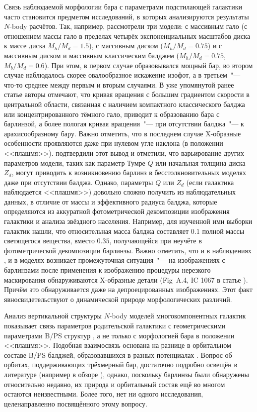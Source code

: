 \documentclass{trlnotes}
\begin{document}
Связь наблюдаемой морфологии бара с параметрами подстилающей галактики часто становится предметом исследований, в которых анализируются
результаты $N$-body расчётов. Так, например, \citet{athanassoula2002} рассмотрели три модели: с массивным гало (с отношением массы гало в пределах четырёх экспоненциальных масштабов диска к массе диска $M_h/M_d = 1.5$), с массивным
диском ($M_h/M_d = 0.75$) и с массивным диском и массивным классическим балджем ($M_h/M_d = 0.75$, $M_b/M_d = 0.6$). При этом, в первом случае
образовывался мощный  бар, во втором случае наблюдалось скорее овалообразное искажение изофот, а в третьем~"--- что-то среднее между первым и
вторым случаями. В уже упомянутой ранее статье \citet{salo2017} авторы отмечают, что кривая вращения с большим градиентом скорости в центральной
области, связанная с наличием компактного классического балджа или концентрированного тёмного гало, приводит к образованию бара с барлинзой, а
более пологая кривая вращения~"--- при отсутствии балджа~"--- к арахисообразному бару. Важно отметить, что в последнем случае X-образные
особенности проявляются даже при нулевом угле наклона (в положении <<плашмя>>).  \citet{smirnov2018} подтвердили этот вывод и отметили, что
варьирование других параметров модели, таких как параметр Тумре $Q$ или начальная толщина диска $Z_d$, могут приводить к возникновению
барлинз в бесстолкновительных моделях даже при отсутствии балджа. Однако, параметры $Q$ или $Z_d$ (если галактика наблюдается <<плашмя>>)
довольно сложно получить из наблюдательных данных, в отличие от массы и эффективного радиуса балджа, которые определяются из аккуратной
фотометрической декомпозиции изображения галактики и анализа звёздного населения. Например, \citet{laurikainen2014} для изученной ими выборки
галактик нашли, что относительная масса балджа составляет $0.1$ полной массы светящегося вещества, вместо $0.35$, получающейся при неучёте в
фотометрической декомпозиции барлинзы. Важно отметить, что и в наблюдениях \citep{laurikainen2017}, и в моделях \citep{salo2017} возникает
промежуточная ситуация~"--- на изображениях с барлинзами после применения к изображению процедуры нерезкого маскирования обнаруживаются
X-образные детали (Fig~A.4, IC 1067 в статье \citealp{laurikainen2017}). Причём это обнаруживается даже на депроецированных изображениях. Этот факт явносвидетельствуют о динамической природе морфологических различий. 


Анализ вертикальной структуры $N$-body моделей многокомпонентных галактик показывает связь параметров родительской галактики с геометрическими параметрами B/PS структур \citep{smirnov2018}, а не только с морфологией бара в положении <<плашмя>>. Подобная взаимосвязь основана на разнице в орбитальном составе B/PS балджей, образовавшихся в разных потенциалах \citep{parul2020}. Вопрос об орбитах, поддерживающих трёхмерный бар, достаточно подробно освещён в литературе (например в обзоре \cite{athanassoula2016}), однако, поскольку барлинзы были обнаружены относительно недавно, их природа и орбитальный состав ещё во многом остаются неизвестными. Более того, нет ни одного исследования, целенаправленно посвящённого этому вопросу.
\end{document}
